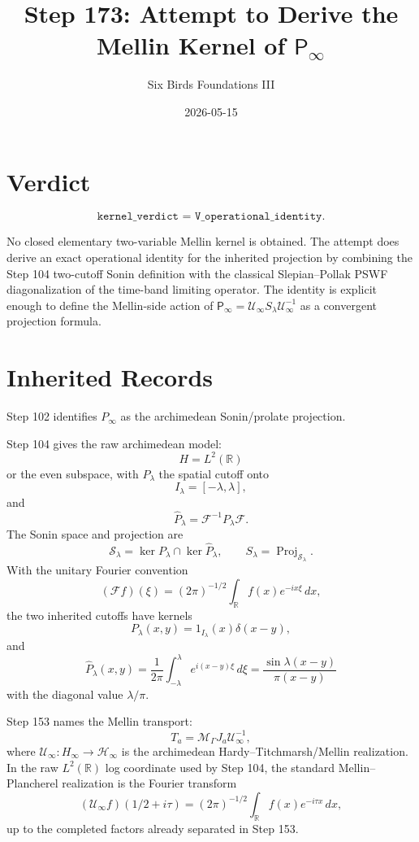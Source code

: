 \documentclass[11pt]{article}
\title{Step 173: Attempt to Derive the Mellin Kernel of \(\mathsf P_\infty\)}
\author{Six Birds Foundations III}
\date{2026-05-15}
\newcommand{\Psym}{\mathsf P_\infty}
\newcommand{\Uinf}{\mathcal U_\infty}
\newcommand{\F}{\mathcal F}
\begin{document}
\maketitle

\section{Verdict}

\[
\boxed{\texttt{kernel\_verdict = V\_operational\_identity}.}
\]

No closed elementary two-variable Mellin kernel is obtained.  The attempt does
derive an exact operational identity for the inherited projection by combining
the Step 104 two-cutoff Sonin definition with the classical
Slepian--Pollak PSWF diagonalization of the time-band limiting operator.  The
identity is explicit enough to define the Mellin-side action of
\(\Psym=\Uinf S_\lambda\Uinf^{-1}\) as a convergent projection formula.

\section{Inherited Records}

Step 102 identifies \(P_\infty\) as the archimedean Sonin/prolate projection.

Step 104 gives the raw archimedean model:
\[
H=L^2(\mathbb R)
\]
or the even subspace, with \(P_\lambda\) the spatial cutoff onto
\[
I_\lambda=[-\lambda,\lambda],
\]
and
\[
\widehat P_\lambda=\F^{-1}P_\lambda\F.
\]
The Sonin space and projection are
\[
\mathcal S_\lambda=\ker P_\lambda\cap\ker\widehat P_\lambda,
\qquad
S_\lambda=\operatorname{Proj}_{\mathcal S_\lambda}.
\]
With the unitary Fourier convention
\[
(\F f)(\xi)=(2\pi)^{-1/2}\int_{\mathbb R}f(x)e^{-ix\xi}\,dx,
\]
the two inherited cutoffs have kernels
\[
P_\lambda(x,y)=1_{I_\lambda}(x)\delta(x-y),
\]
and
\[
\widehat P_\lambda(x,y)
=
\frac{1}{2\pi}\int_{-\lambda}^{\lambda}e^{i(x-y)\xi}\,d\xi
=
\frac{\sin \lambda(x-y)}{\pi(x-y)}
\]
with the diagonal value \(\lambda/\pi\).

Step 153 names the Mellin transport:
\[
T_a=\mathcal M_\Gamma J_a\Uinf^{-1},
\]
where \(\Uinf:H_\infty\to\mathcal H_\infty\) is the archimedean
Hardy--Titchmarsh/Mellin realization.  In the raw \(L^2(\mathbb R)\) log
coordinate used by Step 104, the standard Mellin--Plancherel realization is
the Fourier transform
\[
(\Uinf f)(1/2+i\tau)=(2\pi)^{-1/2}\int_{\mathbb R}f(x)e^{-i\tau x}\,dx,
\]
up to the completed factors already separated in Step 153.
\end{document}
